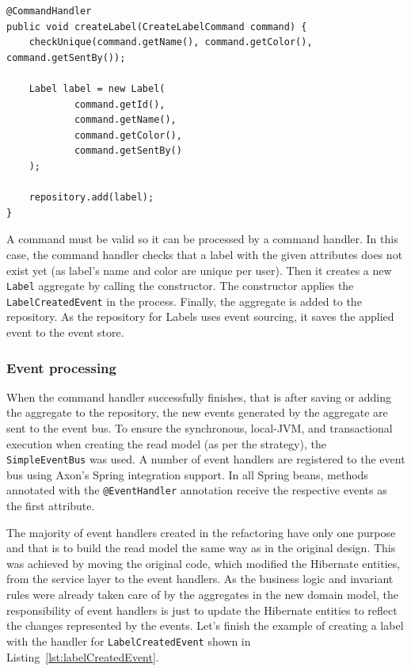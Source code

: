 \documentclass{book}
\begin{document}
\begin{lstlisting}[caption={The command handler for \texttt{CreateLabelCommand}},label={lst:createLabelCommandHandler},captionpos=b,float,floatplacement=H]
@CommandHandler
public void createLabel(CreateLabelCommand command) {
    checkUnique(command.getName(), command.getColor(), command.getSentBy());

    Label label = new Label(
            command.getId(),
            command.getName(),
            command.getColor(),
            command.getSentBy()
    );

    repository.add(label);
}
\end{lstlisting}

A command must be valid so it can be processed by a command handler. In
this case, the command handler checks that a label with the given
attributes does not exist yet (as label's name and color are unique per
user). Then it creates a new \texttt{Label} aggregate by calling the
constructor. The constructor applies the \texttt{LabelCreatedEvent} in
the process. Finally, the aggregate is added to the repository. As the
repository for Labels uses event sourcing, it saves the applied event to
the event store.


\subsubsection{Event processing}\label{event-processing}

When the command handler successfully finishes, that is after saving or
adding the aggregate to the repository, the new events generated by the
aggregate are sent to the event bus. To ensure the synchronous,
local-JVM, and transactional execution when creating the read model (as
per the strategy), the \texttt{SimpleEventBus} was used. A number of
event handlers are registered to the event bus using Axon's Spring
integration support. In all Spring beans, methods annotated with the
\texttt{@EventHandler} annotation receive the respective events as the
first attribute.

The majority of event handlers created in the refactoring have only one
purpose and that is to build the read model the same way as in the
original design. This was achieved by moving the original code, which
modified the Hibernate entities, from the service layer to the event
handlers. As the business logic and invariant rules were already taken
care of by the aggregates in the new domain model, the responsibility of
event handlers is just to update the Hibernate entities to reflect the
changes represented by the events. Let's finish the example of creating
a label with the handler for \texttt{LabelCreatedEvent} shown in Listing~\ref{lst:labelCreatedEvent}.
\end{document}
